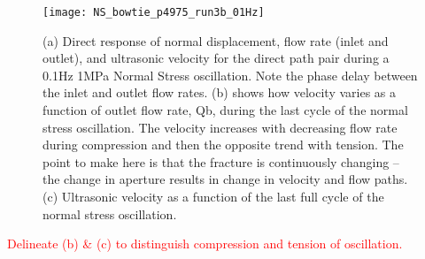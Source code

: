\documentclass[letterpaper,10pt]{article}
\begin{document}
\newpage

\begin{figure}[h]
	\centering
	\texttt{[image: NS\_bowtie\_p4975\_run3b\_01Hz]}
	\caption[]{(a) Direct response of normal displacement, flow rate (inlet and outlet), and ultrasonic velocity for the direct path pair during a 0.1Hz 1MPa Normal Stress oscillation. Note the phase delay between the inlet and outlet flow rates. (b) shows how velocity varies as a function of outlet flow rate, Qb, during the last cycle of the normal stress oscillation. The velocity increases with decreasing flow rate during compression and then the opposite trend with tension. The point to make here is that the fracture is continuously changing -- the change in aperture results in change in velocity and flow paths. (c) Ultrasonic velocity as a function of the last full cycle of the normal stress oscillation.}
	\label{fig:NS_p4975_run3b_01Hz}
\end{figure}

\textcolor{red}{Delineate (b) \& (c) to distinguish compression and tension of oscillation.\\}

\newpage



\end{document}

